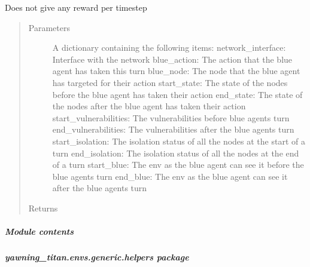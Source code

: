 \documentclass[letterpaper,10pt,english]{sphinxmanual}
\begin{document}
\begin{fulllineitems}
\label{\detokenize{source/yawning_titan.envs.generic.core:yawning_titan.envs.generic.core.reward_functions.zero_reward}}
\sphinxAtStartPar
Does not give any reward per timestep
\begin{quote}\begin{description}
\item[{Parameters}] \leavevmode
\sphinxAtStartPar
{} \textendash{} A dictionary containing the following items:
network\_interface: Interface with the network
blue\_action: The action that the blue agent has taken this turn
blue\_node: The node that the blue agent has targeted for their action
start\_state: The state of the nodes before the blue agent has taken their action
end\_state: The state of the nodes after the blue agent has taken their action
start\_vulnerabilities: The vulnerabilities before blue agents turn
end\_vulnerabilities: The vulnerabilities after the blue agents turn
start\_isolation: The isolation status of all the nodes at the start of a turn
end\_isolation: The isolation status of all the nodes at the end of a turn
start\_blue: The env as the blue agent can see it before the blue agents turn
end\_blue: The env as the blue agent can see it after the blue agents turn

\item[{Returns}] \leavevmode
{}

\end{description}\end{quote}

\end{fulllineitems}



\subparagraph{Module contents}
\label{\detokenize{source/yawning_titan.envs.generic.core:module-yawning_titan.envs.generic.core}}\label{\detokenize{source/yawning_titan.envs.generic.core:module-contents}}

\subparagraph{yawning\_titan.envs.generic.helpers package}
\label{\detokenize{source/yawning_titan.envs.generic.helpers:yawning-titan-envs-generic-helpers-package}}\label{\detokenize{source/yawning_titan.envs.generic.helpers::doc}}
\end{document}
